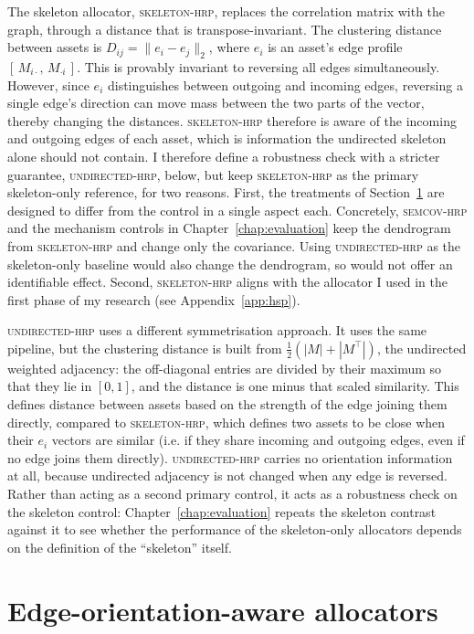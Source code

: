 \documentclass[11pt, a4paper]{report}
\newcommand{\skelhrp}{\textsc{skeleton-hrp}}
\newcommand{\undirhrp}{\textsc{undirected-hrp}}
\newcommand{\semcovhrp}{\textsc{semcov-hrp}}
\begin{document}
The skeleton allocator, \skelhrp{}, replaces the correlation matrix with the graph, through a distance that is transpose-invariant.
The clustering distance between assets is $D_{ij} =
\lVert e_i - e_j \rVert_2$, where $e_i$ is an asset's edge profile $[\,M_{i\cdot},\, M_{\cdot i}\,]$. This is provably invariant to reversing all edges simultaneously.
However, since $e_i$ distinguishes between outgoing and incoming edges, reversing a single edge's direction can move mass between the two parts of the vector, thereby changing the distances.
\skelhrp{} therefore is aware of the incoming and outgoing edges of each asset, which is information the undirected skeleton alone should not contain. 
I therefore define a robustness check with a stricter guarantee, \undirhrp{}, below, but keep \skelhrp{} as the primary skeleton-only reference, for two reasons.
First, the treatments of Section~\ref{sec:orientation-family} are designed to differ from the control in a single aspect each. Concretely, \semcovhrp{} and the
mechanism controls in Chapter~\ref{chap:evaluation} keep the dendrogram from \skelhrp{} and change only the covariance.
Using \undirhrp{} as the skeleton-only baseline would also change the dendrogram, so would not offer an identifiable effect. Second, \skelhrp{} aligns with the allocator I used in the first phase of my research (see Appendix~\ref{app:hsp}).

\undirhrp{} uses a different symmetrisation approach.
It uses the same pipeline, but the clustering distance is built from
$\tfrac{1}{2}(|M|+|M^\top|)$, the undirected weighted adjacency: the
off-diagonal entries are divided by their maximum so that they lie in
$[0,1]$, and the distance is one minus that scaled similarity.
This defines distance between assets based on the strength of the edge joining them directly, compared to \skelhrp{}, which defines two assets to be close when their $e_i$ vectors are similar (i.e. if they share incoming and outgoing edges, even if no edge joins them directly).
\undirhrp{} carries no orientation information
at all, because undirected adjacency is not changed when any edge is reversed.
Rather than acting as a second primary control, it acts as a robustness check on the skeleton control: Chapter~\ref{chap:evaluation} repeats the skeleton contrast against it to see whether the performance of the skeleton-only allocators depends on the definition of the ``skeleton'' itself.

\section{Edge-orientation-aware allocators}
\label{sec:orientation-family}
\end{document}
